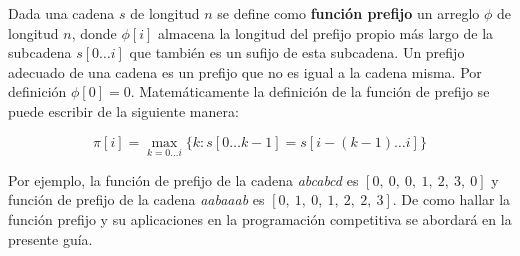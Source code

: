Dada una cadena $s$ de longitud $n$ se define como \textbf{función prefijo} un arreglo $\phi$ de longitud $n$, donde $\phi[i]$ almacena la longitud del prefijo propio más largo de la subcadena $s[0\dots i]$ que también es un sufijo de esta subcadena. Un prefijo adecuado de una cadena es un prefijo que no es igual a la cadena misma. Por definición  $\phi[0]=0$. Matemáticamente la definición de la función de prefijo se puede escribir de la siguiente manera:

 $$\pi[i] = \max_ {k = 0 \dots i} \{k : s[0 \dots k-1] = s[i-(k-1) \dots i] \}$$
 
 Por ejemplo, la función de prefijo de la cadena \emph{abcabcd} es $[0,~0,~0,~1,~2,~3,~0]$ y función de prefijo de la cadena \emph{aabaaab} es $[0,~1,~0,~1,~2,~ 2,~3]$. De como hallar la función prefijo y su aplicaciones en la programación competitiva se abordará en la presente guía.